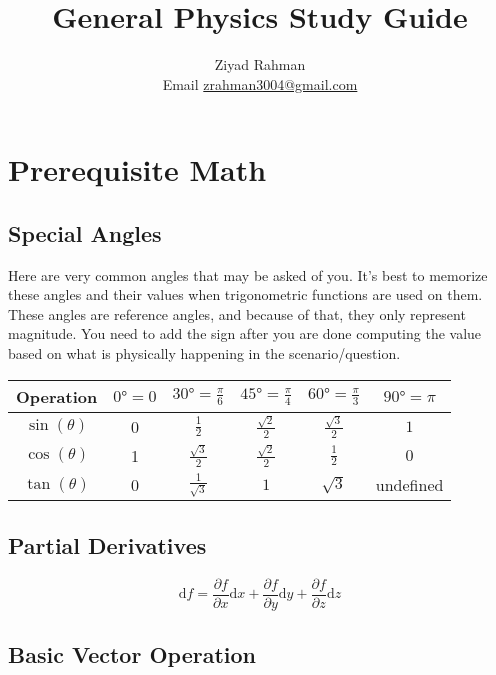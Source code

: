 \documentclass{article}
\title{General Physics Study Guide}
\author{Ziyad Rahman \\ Email \href{zrahman3004@gmail.com}{zrahman3004@gmail.com} }
\date{}
\begin{document}
\maketitle

\tableofcontents
\newpage

\section{Prerequisite Math}

\subsection{Special Angles}

Here are very common angles that may be asked of you. It's best to memorize these angles and their
values when trigonometric functions are used on them. These angles are reference angles, and because
of that, they only represent magnitude. You need to add the sign after you are done computing the value based
on what is physically happening in the scenario/question.

\begin{center}
\begin{tabular}{| c | c | c | c | c | c |}
    \hline
    Operation & $\ang{0} = 0 $ & $\ang{30} = \frac{\pi}{6}$ & $\ang{45} = \frac{\pi}{4}$ & $\ang{60} = \frac{\pi}{3}$ & $\ang{90} = \pi$ \\
    \hline
    $\sin (\theta)$ & 0 & $\frac{1}2$ & $\frac{\sqrt{2}}{2}$ & $\frac{\sqrt{3}}{2}$ & $1$ \\
    \hline
    $\cos (\theta)$ & 1 & $\frac{\sqrt{3}}{2}$ & $\frac{\sqrt{2}}{2}$ & $\frac{1}2$ & $0$ \\
    \hline
    $\tan (\theta)$ & 0 & $\frac{1}{\sqrt{3}}$ & $1$ & $\sqrt{3}$ & undefined \\
    \hline
\end{tabular}
\end{center}

\subsection{Partial Derivatives}

\begin{equation}
    \mathrm{d}f = \frac{\partial f}{\partial x} \mathrm{d}x + \frac{\partial f}{\partial y} \mathrm{d}y + \frac{\partial f}{\partial z} \mathrm{d}z
\end{equation}
\subsection{Basic Vector Operation}
\end{document}
